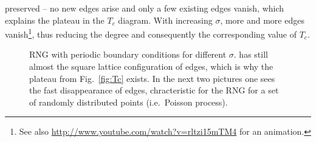         preserved -- no new edges arise and only a few existing edges vanish, which
        explains the plateau in the \(T_{c}\) diagram. With
        increasing \(\sigma\), more and more edges vanish\footnote{See also \url{http://www.youtube.com/watch?v=rltzi15mTM4} for an animation.},
        thus reducing the degree and consequently the corresponding value of \(T_{c}\).
        \begin{figure}[htb]
            \centering

            \caption[Examples of RNG for different $\sigma$]
            {
                RNG with periodic boundary conditions for different \(\sigma\).
                 has still almost the square lattice
                configuration of edges, which is why the plateau from Fig.\ \ref{fig:Tc}
                exists. In the next two pictures one sees the fast disappearance
                of edges, chracteristic for the RNG for a set of randomly
                distributed points (i.e.\ Poisson process).
            }
            \label{fig:RNG_sigma}
        \end{figure}
        \clearpage

